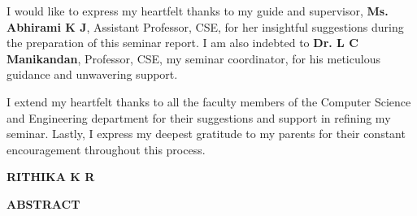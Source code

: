 \documentclass[12pt,a4paper]{report}
\begin{document}
\vspace{0.4cm}
\noindent
I would like to express my heartfelt thanks to my guide and supervisor, \textbf{Ms. Abhirami K J}, Assistant Professor, CSE, for her insightful suggestions during the preparation of this seminar report. I am also indebted to \textbf{Dr. L C Manikandan}, Professor, CSE, my seminar coordinator, for his meticulous guidance and unwavering support.

\vspace{0.4cm}
\noindent
I extend my heartfelt thanks to all the faculty members of the Computer Science and Engineering department for their suggestions and support in refining my seminar. Lastly, I express my deepest gratitude to my parents for their constant encouragement throughout this process.

\vspace{1.5cm}
\noindent
\hfill \textbf{RITHIKA K R}

\newpage
{}

\begin{center}
    {\fontsize{14pt}{17pt}\selectfont \textbf{ABSTRACT}\par}
\end{center}
\end{document}
